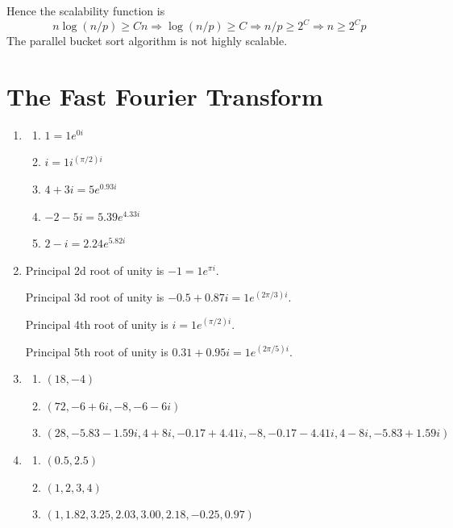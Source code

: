 \begin{enumerate}
\begin{enumerate}
      Hence the scalability function is
      $$n\log(n/p) \ge Cn \Rightarrow \log(n/p) \ge C 
                          \Rightarrow n/p \ge 2^C
                          \Rightarrow n \ge 2^Cp$$
      The parallel bucket sort algorithm is not highly scalable.
\end{enumerate}

\end{enumerate}

\chapter{The Fast Fourier Transform}

\begin{enumerate}
\item  \begin{enumerate}
       \item $1 = 1e^{0i}$
       \item $i = 1i^{(\pi/2)i}$
       \item $4 + 3i = 5e^{0.93i}$
       \item $-2 -5i = 5.39e^{4.33i}$
       \item $2 - i = 2.24e^{5.82i}$
       \end{enumerate}

\item Principal 2d root of unity is $-1 = 1e^{\pi i}$.

      Principal 3d root of unity is $-0.5 + 0.87i = 1e^{(2\pi/3)i}$.

      Principal 4th root of unity is $i = 1e^{(\pi/2)i}$.

      Principal 5th root of unity is $0.31 + 0.95i = 1e^{(2\pi/5)i}$.
\item \begin{enumerate}
       \item $(18, -4)$
       \item $(72, -6+6i, -8, -6-6i)$
       \item $(28, -5.83-1.59i, 4+8i, -0.17+4.41i, -8,
              -0.17-4.41i, 4-8i, -5.83+1.59i)$
      \end{enumerate}

\item \begin{enumerate}
       \item $(0.5, 2.5)$
       \item $(1, 2, 3, 4)$
       \item $(1, 1.82, 3.25, 2.03, 3.00, 2.18, -0.25, 0.97)$
      \end{enumerate}


\end{enumerate}

